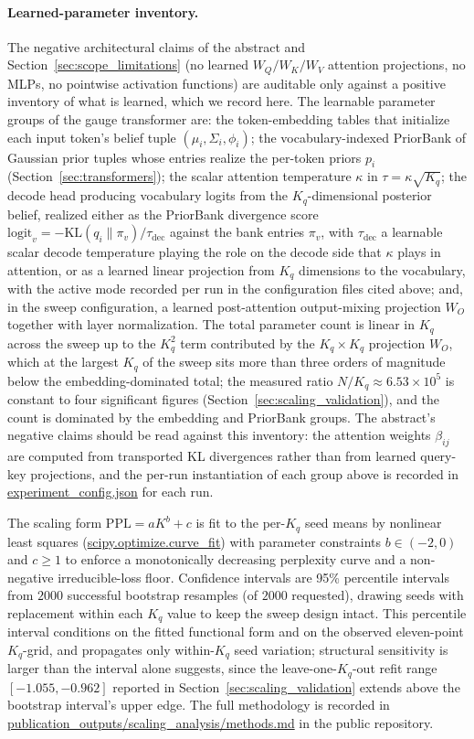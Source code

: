 \documentclass[11pt]{article}
\begin{document}
\paragraph{Learned-parameter inventory.} The negative architectural claims of the abstract and Section~\ref{sec:scope_limitations} (no learned $W_Q/W_K/W_V$ attention projections, no MLPs, no pointwise activation functions) are auditable only against a positive inventory of what is learned, which we record here. The learnable parameter groups of the gauge transformer are: the token-embedding tables that initialize each input token's belief tuple $(\mu_i, \Sigma_i, \phi_i)$; the vocabulary-indexed PriorBank of Gaussian prior tuples whose entries realize the per-token priors $p_i$ (Section~\ref{sec:transformers}); the scalar attention temperature $\kappa$ in $\tau = \kappa\sqrt{K_q}$; the decode head producing vocabulary logits from the $K_q$-dimensional posterior belief, realized either as the PriorBank divergence score $\mathrm{logit}_v = -\mathrm{KL}(q_i \| \pi_v)/\tau_{\mathrm{dec}}$ against the bank entries $\pi_v$, with $\tau_{\mathrm{dec}}$ a learnable scalar decode temperature playing the role on the decode side that $\kappa$ plays in attention, or as a learned linear projection from $K_q$ dimensions to the vocabulary, with the active mode recorded per run in the configuration files cited above; and, in the sweep configuration, a learned post-attention output-mixing projection $W_O$ together with layer normalization. The total parameter count is linear in $K_q$ across the sweep up to the $K_q^2$ term contributed by the $K_q \times K_q$ projection $W_O$, which at the largest $K_q$ of the sweep sits more than three orders of magnitude below the embedding-dominated total; the measured ratio $N/K_q \approx 6.53\times 10^5$ is constant to four significant figures (Section~\ref{sec:scaling_validation}), and the count is dominated by the embedding and PriorBank groups. The abstract's negative claims should be read against this inventory: the attention weights $\beta_{ij}$ are computed from transported KL divergences rather than from learned query-key projections, and the per-run instantiation of each group above is recorded in \url{experiment_config.json} for each run.

The scaling form $\mathrm{PPL} = aK^b + c$ is fit to the per-$K_q$ seed means by nonlinear least squares (\url{scipy.optimize.curve_fit}) with parameter constraints $b \in (-2, 0)$ and $c \geq 1$ to enforce a monotonically decreasing perplexity curve and a non-negative irreducible-loss floor. Confidence intervals are 95\% percentile intervals from $2000$ successful bootstrap resamples (of $2000$ requested), drawing seeds with replacement within each $K_q$ value to keep the sweep design intact. This percentile interval conditions on the fitted functional form and on the observed eleven-point $K_q$-grid, and propagates only within-$K_q$ seed variation; structural sensitivity is larger than the interval alone suggests, since the leave-one-$K_q$-out refit range $[-1.055, -0.962]$ reported in Section~\ref{sec:scaling_validation} extends above the bootstrap interval's upper edge. The full methodology is recorded in \url{publication_outputs/scaling_analysis/methods.md} in the public repository.
\end{document}
